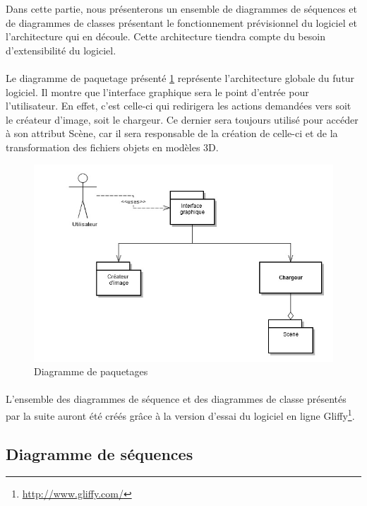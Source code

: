Dans cette partie, nous présenterons un ensemble de diagrammes de séquences et de diagrammes de classes présentant le fonctionnement prévisionnel du logiciel et l’architecture qui en découle. Cette architecture tiendra compte du besoin d’extensibilité du logiciel.

\paragraph{}
Le diagramme de paquetage présenté \ref{fig:diagPaquetage} représente l’architecture globale du futur logiciel. Il montre que l'interface graphique sera le point d'entrée pour l'utilisateur. En effet,  c’est celle-ci qui redirigera les actions demandées vers soit le créateur d’image, soit le chargeur. Ce dernier sera toujours utilisé pour accéder à son attribut Scène, car il sera responsable de la création de celle-ci et de la transformation des fichiers objets en modèles 3D.

\begin{figure}[h]
		\centering
		\includegraphics[scale=0.4]{diag_packages.jpg}
		\caption{\label{fig:diagPaquetage} Diagramme de paquetages}
\end{figure}

\paragraph{}
L’ensemble des diagrammes de séquence et des diagrammes de classe présentés par la suite auront été créés grâce à la version d’essai du logiciel en ligne Gliffy\footnote{\url{http://www.gliffy.com/}}.


\subsection{Diagramme de séquences}


